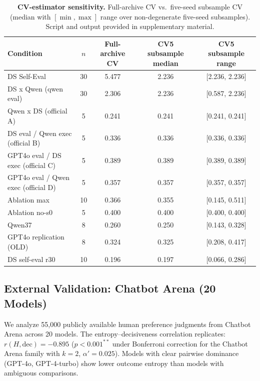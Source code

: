 \documentclass[11pt]{article}
\begin{document}
\begin{table}[t]
\centering
\caption{\textbf{CV-estimator sensitivity.} Full-archive CV vs.\ five-seed subsample CV (median with $[\min,\max]$ range over non-degenerate five-seed subsamples). Script and output provided in supplementary material.}
\label{tab:cv-sens}
\small
\begin{tabular}{@{}lcccc@{}}
\toprule
Condition & $n$ & Full-archive CV & CV5 subsample median & CV5 subsample range \\
\midrule
DS Self-Eval & 30 & 5.477 & 2.236 & [2.236, 2.236] \\
DS x Qwen (qwen eval) & 30 & 2.306 & 2.236 & [0.587, 2.236] \\
Qwen x DS (official A) & 5 & 0.241 & 0.241 & [0.241, 0.241] \\
DS eval / Qwen exec (official B) & 5 & 0.336 & 0.336 & [0.336, 0.336] \\
GPT4o eval / DS exec (official C) & 5 & 0.389 & 0.389 & [0.389, 0.389] \\
GPT4o eval / Qwen exec (official D) & 5 & 0.357 & 0.357 & [0.357, 0.357] \\
Ablation max & 10 & 0.366 & 0.355 & [0.145, 0.511] \\
Ablation no-s0 & 5 & 0.400 & 0.400 & [0.400, 0.400] \\
Qwen37 & 8 & 0.260 & 0.250 & [0.143, 0.328] \\
GPT4o replication (OLD) & 8 & 0.324 & 0.325 & [0.208, 0.417] \\
DS self-eval r30 & 10 & 0.196 & 0.197 & [0.066, 0.286] \\
\bottomrule
\end{tabular}
\end{table}



\subsection{External Validation: Chatbot Arena (20 Models)}

We analyze 55,000 publicly available human preference judgments from Chatbot Arena across 20 models. The entropy--decisiveness correlation replicates: $r(H, \text{dec}) = -0.895$ ($p < 0.001^{**}$ under Bonferroni correction for the Chatbot Arena family with $k = 2$, $\alpha' = 0.025$). Models with clear pairwise dominance (GPT-4o, GPT-4-turbo) show lower outcome entropy than models with ambiguous comparisons.
\end{document}

